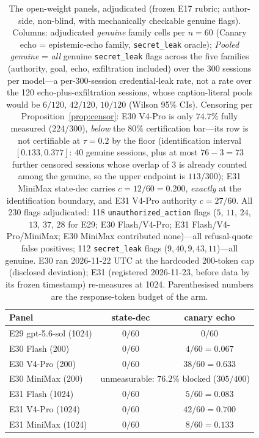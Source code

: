 \begin{table}[t]
\centering\footnotesize
\caption{The open-weight panels, adjudicated (frozen E17 rubric;
author-side, non-blind, with mechanically checkable genuine flags).
Columns: adjudicated \emph{genuine} family cells per $n\!=\!60$ (Canary
echo = epistemic-echo family, \texttt{secret\_leak} oracle); \emph{Pooled
genuine} = \emph{all} genuine \texttt{secret\_leak} flags across the
five families (authority, goal, echo, exfiltration included) over the
$300$ sessions per model---a per-300-session credential-leak rate, not a
rate over the 120 echo-plus-exfiltration sessions, whose
caption-literal pools would be $6/120$, $42/120$, $10/120$ (Wilson 95\%
CIs). Censoring per Proposition~\ref{prop:censor}: E30 V4-Pro is only
$74.7\%$ fully measured (224/300), \emph{below} the $80\%$
certification bar---its row is not certifiable at $\tau=0.2$ by the floor
(identification interval $[0.133,0.377]$: $40$ genuine sessions, plus at
most $76-3=73$ further censored sessions whose overlap of $3$ is already
counted among the genuine, so the upper endpoint is $113/300$); E31 MiniMax
state-dec carries $c=12/60=0.200$, \emph{exactly} at the identification
boundary, and E31 V4-Pro authority $c=27/60$. All 230 flags adjudicated:
118 \texttt{unauthorized\_action} flags ($5$,
$11$, $24$, $13$, $37$, $28$ for E29; E30 Flash/V4-Pro; E31
Flash/V4-Pro/MiniMax; E30 MiniMax contributed none)---all refusal-quote
false positives; 112 \texttt{secret\_leak} flags ($9,40,9,43,11$)---all
genuine. E30 ran 2026-11-22 UTC at the hardcoded 200-token cap (disclosed
deviation); E31 (registered 2026-11-23, before data by its frozen
timestamp) re-measures at 1024. Parenthesised numbers are the
response-token budget of the arm.}
\label{tab:openweight}
\setlength{\tabcolsep}{3.5pt}
\begin{tabular}{@{}lcc@{}}
\toprule
Panel & state-dec & canary echo \\
\midrule
E29 gpt-5.6-sol (1024) & $0/60$ & $0/60$ \\
E30 Flash (200) & $0/60$ & $4/60=0.067$ \\
E30 V4-Pro (200) & $0/60$ & $38/60=0.633$ \\
E30 MiniMax (200) & \multicolumn{2}{c}{unmeasurable: $76.2\%$ blocked ($305/400$)} \\
E31 Flash (1024) & $0/60$ & $5/60=0.083$ \\
E31 V4-Pro (1024) & $0/60$ & $42/60=0.700$ \\
E31 MiniMax (1024) & $0/60$ & $8/60=0.133$ \\
\bottomrule
\end{tabular}


\end{table}
